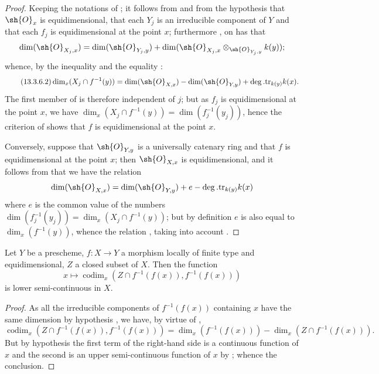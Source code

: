\begin{proof}
Keeping the notations of ; it follows from  and from the hypothesis that $\sh{O}_x$ is equidimensional, that each $Y_j$ is an irreducible component of $Y$ and that each $f_j$ is equidimensional at the point $x$; furthermore , on has  that
\[
  \dim(\sh{O}_{X_j,x})=\dim(\sh{O}_{Y_j,y})+\dim(\sh{O}_{X_j,x}\otimes_{\sh{O}_{Y_j,y}}k(y));
\]
whence, by the inequality  and the equality :
\[
\tag{13.3.6.2}
  \dim_x(X_j\cap f^{-1}(y))=\dim(\sh{O}_{X,x})-\dim(\sh{O}_{Y,y})+\deg.\mathrm{tr}_{k(y)}k(x).
\]
The first member of  is therefore independent of $j$; but as $f_j$ is equidimensional at the point $x$, we have $\dim_x(X_j\cap f^{-1}(y))=\dim(f_j^{-1}(y_j))$, hence the criterion of  shows that $f$ is equidimensional at the point $x$.

Conversely, suppose that $\sh{O}_{Y,y}$ is a universally catenary ring and that $f$ is equidimensional at the point $x$; then  $\sh{O}_{X,x}$ is equidimensional, and it follows from  that we have the relation
\[
  \dim(\sh{O}_{X,x})=\dim(\sh{O}_{Y,y})+e-\deg.\mathrm{tr}_{k(y)}k(x)
\]
where $e$ is the common value of the numbers $\dim(f_j^{-1}(y_j))=\dim_x(X_j\cap f^{-1}(y))$; but by definition $e$ is also equal to $\dim_x(f^{-1}(y))$, whence the relation , taking into account .
\end{proof}

\begin{proposition}[13.3.7]
\label{IV.13.3.7}
Let $Y$ be a prescheme, $f:X\to Y$ a morphism locally of finite type and equidimensional, $Z$ a closed subset of $X$.
Then the function
\[
\tag{13.3.7.1}
  x\mapsto\operatorname{codim}_x(Z\cap f^{-1}(f(x)),f^{-1}(f(x)))
\]
is lower semi-continuous in $X$.
\end{proposition}

\begin{proof}
As all the irreducible components of $f^{-1}(f(x))$ containing $x$ have the same dimension by hypothesis , we have, by virtue of ,
\[
  \operatorname{codim}_x(Z\cap f^{-1}(f(x)),f^{-1}(f(x)))=\dim_x(f^{-1}(f(x)))-\dim_x(Z\cap f^{-1}(f(x))).
\]
But by hypothesis the first term of the right-hand side is a continuous function of $x$  and the second is an upper semi-continuous function of $x$ by ; whence the conclusion.
\end{proof}

